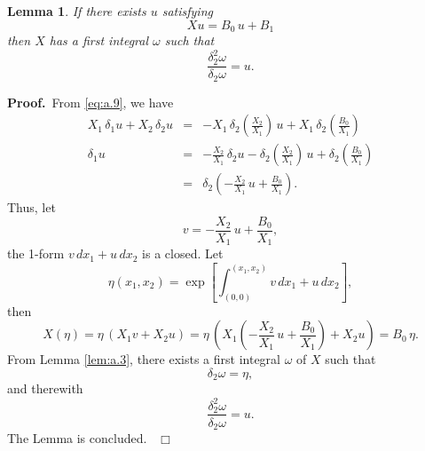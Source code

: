 \documentclass[preprint, 12pt]{elsarticle}
\newtheorem{lem}[thm]{Lemma}
\numberwithin{equation}{section}
\newenvironment{proof}[1][Proof]{\textbf{#1.}\ }{\ $\Box$}
\begin{document}
\begin{lem}
\label{lem:a.4}If there exists $u$ satisfying
\begin{equation}
\label{eq:a.9} X u = B_0\, u  + B_1
\end{equation}
 then $X$ has a first
integral $\omega$ such that
$$\frac{\delta_2^2\omega}{\delta_2 \omega} = u.$$
\end{lem}
\begin{proof}From \eqref{eq:a.9}, we have
\begin{eqnarray*}
X_1\,\delta_1 u + X_2\,\delta_2 u &=&
-X_1\,\delta_2(\frac{X_2}{X_1})\,u +
X_1\,\delta_2(\frac{B_0}{X_1})\\
\delta_1 u&=& -\frac{X_2}{X_1}\,\delta_2u -
\delta_2(\frac{X_2}{X_1})\,u + \delta_2(\frac{B_0}{X_1})\\
&=&\delta_2(-\frac{X_2}{X_1}\,u + \frac{B_0}{X_1}).
\end{eqnarray*}
Thus, let
$$v = -\frac{X_2}{X_1}\,u + \frac{B_0}{X_1},$$
the 1-form $v\, d x_1 + u\, d x_2$ is a closed. Let
$$\eta(x_1,x_2) = \exp\left[\int_{(0,0)}^{(x_1,x_2)} v\, d x_1 + u\, d x_2\right],$$
then
$$X(\eta) = \eta\,(X_1 v + X_2 u) = \eta\, (X_1 (-\frac{X_2}{X_1}\,u + \frac{B_0}{X_1}) + X_2 u) = B_0\,\eta.$$
From Lemma \ref{lem:a.3}, there exists a first integral $\omega$ of
$X$ such that
$$\delta_2\omega  = \eta,$$
and therewith
$$\frac{\delta_2^2\omega}{\delta_2\omega} = u.$$
The Lemma is concluded.
\end{proof}
\end{document}
